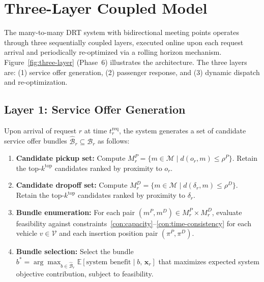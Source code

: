 
\section*{Three-Layer Coupled Model}\label{sec:three-layer}

The many-to-many DRT system with bidirectional meeting points operates through three
sequentially coupled layers, executed online upon each request arrival and periodically
re-optimized via a rolling horizon mechanism. Figure~\ref{fig:three-layer} (Phase~6)
illustrates the architecture. The three layers are: (1) service offer generation,
(2) passenger response, and (3) dynamic dispatch and re-optimization.

\subsection*{Layer 1: Service Offer Generation}\label{sec:layer1}

Upon arrival of request $r$ at time $t_r^{\text{req}}$, the system generates a set of
candidate service offer bundles $\hat{\mathcal{B}}_r \subseteq \mathcal{B}_r$ as follows:

\begin{enumerate}
  \item \textbf{Candidate pickup set:} Compute
        $M_r^P = \{ m \in \mathcal{M} \mid d(o_r, m) \leq \rho^P \}$.
        Retain the top-$k^{\text{top}}$ candidates ranked by proximity to $o_r$.
  \item \textbf{Candidate dropoff set:} Compute
        $M_r^D = \{ m \in \mathcal{M} \mid d(\delta_r, m) \leq \rho^D \}$.
        Retain the top-$k^{\text{top}}$ candidates ranked by proximity to $\delta_r$.
  \item \textbf{Bundle enumeration:} For each pair $(m^P, m^D) \in M_r^P \times M_r^D$,
        evaluate feasibility against constraints~\ref{con:capacity}--\ref{con:time-consistency}
        for each vehicle $v \in \mathcal{V}$ and each insertion position pair $(\pi^P, \pi^D)$.
  \item \textbf{Bundle selection:} Select the bundle
        $b^* = \arg\max_{b \in \hat{\mathcal{B}}_r} \mathbb{E}[\text{system benefit} \mid b,\, \mathbf{x}_r]$
        that maximizes expected system objective contribution, subject to feasibility.
\end{enumerate}

